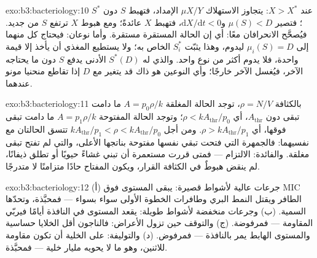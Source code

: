\begin{solution}{exo:b3:bacteriology:10}
عند $X > X^{*}$: يتجاوز الاستهلاك $\mu X/Y$ الإمداد، فتهبط $S$ دون
$S^{*}$؛ فتصير $\mu(S) < D$ و$\mathrm{d}X/\mathrm{d}t < 0$، فتهبط $X$
عائدةً؛ ومع هبوط $X$ ترتفع $S$ من جديد. فيُصحَّح الانحرافان معًا: أي إن
الحالة المستقرة مستقرة. وأما نوعان: فيحتاج كل منهما إلى $\mu_{i}(S) = D$ ليدوم،
وهذا يثبّت $S_{i}^{*}$ الخاص به؛ ولا يستطيع المغذي أن يأخذ إلا
قيمة واحدة، فلا يدوم أكثر من نوع واحد. والذي له $S^{*}(D)$ الأدنى
يدفع $S$ دون ما يحتاجه الآخر، فيُغسل الآخر خارجًا؛ وأي النوعين
هو ذاك قد يتغير مع $D$ إذا تقاطع منحنيا مونو عندهما.
\end{solution}

\begin{solution}{exo:b3:bacteriology:11}
بالكثافة $\rho = N/V$، توجد الحالة المغلقة $A = p_{0}\rho/k$ ما دامت
تبقى دون $A_{\text{thr}}$، أي $\rho < kA_{\text{thr}}/p_{0}$؛
وتوجد الحالة المفتوحة $A = p_{1}\rho/k$ ما دامت تبقى فوقها، أي $\rho
> kA_{\text{thr}}/p_{1}$. ومن أجل $kA_{\text{thr}}/p_{1} < \rho <
kA_{\text{thr}}/p_{0}$ تتسق الحالتان مع نفسيهما: فالجمهرة التي
فتحت تبقي نفسها مفتوحة بناتجها الأعلى، والتي لم تفتح
تبقى مغلقة. والفائدة: الالتزام --- فمتى قررت مستعمرة أن تبني
غشاءً حيويًا أو تطلق ذيفانًا، لم ينقض هبوطٌ في الكثافة القرار،
ويكون المفتاح حادًا متزامنًا لا متدرجًا.
\end{solution}

\begin{solution}{exo:b3:bacteriology:12}
(أ) جرعات عالية لأشواط قصيرة: يبقى المستوى فوق MIC الطافر
ويقتل النمط البري وطافرات الخطوة الأولى سواء بسواء --- فمحبَّذة، وتحدّها
السمية. (ب) وجرعات منخفضة لأشواط طويلة: يقعد المستوى في
النافذة أيامًا فيربّي المقاومة --- فمرفوضة. (ج) والتوقف حين
تزول الأعراض: فالناجون أقل الخلايا حساسية والمستوى الهابط
يمر بالنافذة --- فمرفوض. (د) والتوليفة:
على الخلية أن تكون مقاومة للاثنين، وهو ما لا يحويه مليار خلية
--- فمحبَّذة.
\end{solution}

